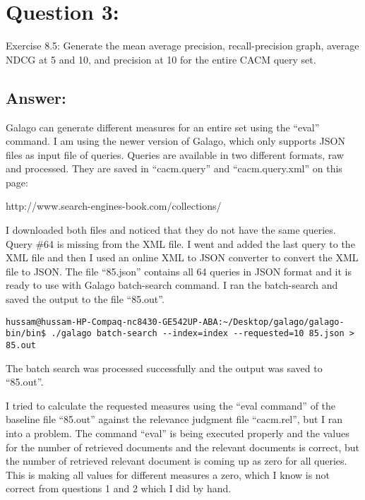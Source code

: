 \section*{Question 3:}
Exercise 8.5:
Generate the mean average precision, recall-precision graph, average NDCG at 5 and 10, and precision at 10 for the entire CACM query set.
\subsection*{Answer:}
Galago can generate different measures for an entire set using the ``eval'' command. I am using the newer version of Galago, which only supports JSON files as input file of queries. Queries are available in two different formats, raw and processed. They are saved in ``cacm.query'' and ``cacm.query.xml'' on this page:

http://www.search-engines-book.com/collections/

I downloaded both files and noticed that they do not have the same queries. Query \#64 is missing from the XML file. I went and added the last query to the XML file and then I used an online XML to JSON converter to convert the XML file to JSON. The file ``85.json'' contains all 64 queries in JSON format and it is ready to use with Galago batch-search command. I ran the batch-search and saved the output to the file ``85.out''.

\begin{lstlisting}[breakatwhitespace=〈false)]
hussam@hussam-HP-Compaq-nc8430-GE542UP-ABA:~/Desktop/galago/galago-bin/bin$ ./galago batch-search --index=index --requested=10 85.json > 85.out
\end{lstlisting}

The batch search was processed successfully and the output was saved to ``85.out''.

I tried to calculate the requested measures using the ``eval command'' of the baseline file ``85.out'' against the relevance judgment file ``cacm.rel'', but I ran into a problem. The command ``eval'' is being executed properly and the values for the number of retrieved documents and the relevant documents is correct, but the number of retrieved relevant document is coming up as zero for all queries. This is making all values for different measures a zero, which I know is not correct from questions 1 and 2 which I did by hand.

